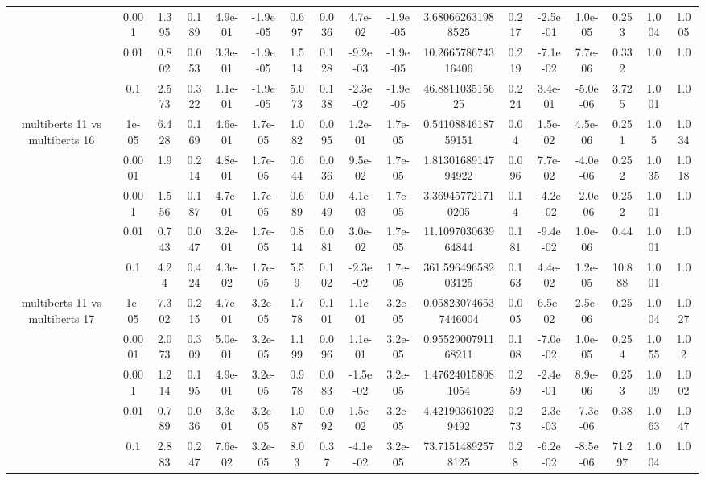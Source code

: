 \begin{tabular}{|c|c|c|c|c|c|c|c|c|c|c|c|c|c|c|c|c|}
 & 0.001 & 1.395 & 0.189 & 4.9e-01 & -1.9e-05 & 0.697 & 0.036 & 4.7e-02 & -1.9e-05 & 3.680662631988525 & 0.217 & -2.5e-01 & 1.0e-05 & 0.253 & 1.004 & 1.005 \\
 & 0.01 & 0.802 & 0.053 & 3.3e-01 & -1.9e-05 & 1.514 & 0.128 & -9.2e-03 & -1.9e-05 & 10.266578674316406 & 0.219 & -7.1e-02 & 7.7e-06 & 0.332 & 1.0 & 1.0 \\
 & 0.1 & 2.573 & 0.322 & 1.1e-01 & -1.9e-05 & 5.073 & 0.138 & -2.3e-02 & -1.9e-05 & 46.881103515625 & 0.224 & 3.4e-01 & -5.0e-06 & 3.725 & 1.001 & 1.0 \\
\hline
\multirow{5}{*}{multiberts 11 vs multiberts 16} & 1e-05 & 6.428 & 0.169 & 4.6e-01 & 1.7e-05 & 1.082 & 0.095 & 1.2e-01 & 1.7e-05 & 0.5410884618759151 & 0.04 & 1.5e-02 & 4.5e-06 & 0.251 & 1.05 & 1.034 \\
 & 0.0001 & 1.9 & 0.214 & 4.8e-01 & 1.7e-05 & 0.644 & 0.036 & 9.5e-02 & 1.7e-05 & 1.8130168914794922 & 0.096 & 7.7e-02 & -4.0e-06 & 0.252 & 1.035 & 1.018 \\
 & 0.001 & 1.556 & 0.187 & 4.7e-01 & 1.7e-05 & 0.689 & 0.049 & 4.1e-03 & 1.7e-05 & 3.369457721710205 & 0.14 & -4.2e-02 & -2.0e-06 & 0.252 & 1.001 & 1.0 \\
 & 0.01 & 0.743 & 0.047 & 3.2e-01 & 1.7e-05 & 0.814 & 0.081 & 3.0e-02 & 1.7e-05 & 11.109703063964844 & 0.181 & -9.4e-02 & 1.0e-06 & 0.44 & 1.001 & 1.0 \\
 & 0.1 & 4.24 & 0.424 & 4.3e-02 & 1.7e-05 & 5.59 & 0.102 & -2.3e-02 & 1.7e-05 & 361.59649658203125 & 0.163 & 4.4e-02 & 1.2e-05 & 10.888 & 1.001 & 1.0 \\
\hline
\multirow{5}{*}{multiberts 11 vs multiberts 17} & 1e-05 & 7.302 & 0.215 & 4.7e-01 & 3.2e-05 & 1.778 & 0.101 & 1.1e-01 & 3.2e-05 & 0.058230746537446004 & 0.005 & 6.5e-02 & 2.5e-06 & 0.25 & 1.004 & 1.027 \\
 & 0.0001 & 2.073 & 0.309 & 5.0e-01 & 3.2e-05 & 1.199 & 0.096 & 1.1e-01 & 3.2e-05 & 0.9552900791168211 & 0.108 & -7.0e-02 & 1.0e-05 & 0.254 & 1.055 & 1.02 \\
 & 0.001 & 1.214 & 0.195 & 4.9e-01 & 3.2e-05 & 0.978 & 0.083 & -1.5e-02 & 3.2e-05 & 1.476240158081054 & 0.259 & -2.4e-01 & 8.9e-06 & 0.253 & 1.009 & 1.002 \\
 & 0.01 & 0.789 & 0.036 & 3.3e-01 & 3.2e-05 & 1.087 & 0.092 & 1.5e-02 & 3.2e-05 & 4.421903610229492 & 0.273 & -2.3e-03 & -7.3e-06 & 0.38 & 1.063 & 1.047 \\
 & 0.1 & 2.883 & 0.247 & 7.6e-02 & 3.2e-05 & 8.03 & 0.37 & -4.1e-02 & 3.2e-05 & 73.71514892578125 & 0.28 & -6.2e-02 & -8.5e-06 & 71.297 & 1.004 & 1.0 \\

\end{tabular}

